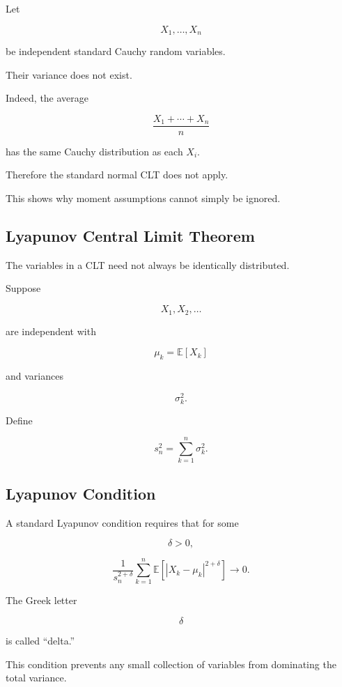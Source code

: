 Let

\[
X_1,\ldots,X_n
\]

be independent standard Cauchy random variables.

Their variance does not exist.

Indeed, the average

\[
\frac{
X_1+\cdots+X_n
}{n}
\]

has the same Cauchy distribution as each \(X_i\).

Therefore the standard normal CLT does not apply.

This shows why moment assumptions cannot simply be ignored.

\subsection{Lyapunov Central Limit Theorem}
\label{subsec:lyapunov-clt}

The variables in a CLT need not always be identically distributed.

Suppose

\[
X_1,X_2,\ldots
\]

are independent with

\[
\mu_k
=
\mathbb{E}[X_k]
\]

and variances

\[
\sigma_k^2.
\]

Define

\[
s_n^2
=
\sum_{k=1}^{n}\sigma_k^2.
\]

\subsection{Lyapunov Condition}
\label{subsec:lyapunov-condition}

A standard Lyapunov condition requires that for some

\[
\delta>0,
\]

\[
\boxed{
\frac{
1
}{
s_n^{2+\delta}
}
\sum_{k=1}^{n}
\mathbb{E}
\left[
|X_k-\mu_k|^{2+\delta}
\right]
\to0.
}
\]

The Greek letter

\[
\delta
\]

is called ``delta.''

This condition prevents any small collection of variables from
dominating the total variance.

